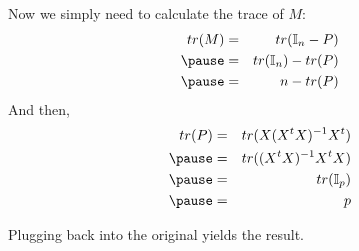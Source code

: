 \begin{frame}[fragile] \frametitle{}

Now we simply need to calculate the trace of $M$:
\begin{eqnarray*}
tr(M) &=& tr(\mathbb{I}_n - P) \\ \pause
&=& tr(\mathbb{I}_n) - tr(P) \\ \pause
&=& n - tr(P)
\end{eqnarray*}
\pause And then,
\begin{eqnarray*}
tr(P) &=& tr(X (X^t X)^{-1} X^t) \\ \pause
&=& tr((X^t X)^{-1} X^t X) \\ \pause
&=& tr( \mathbb{I}_p ) \\ \pause
&=& p
\end{eqnarray*}

\pause Plugging back into the original yields the result.

\end{frame}




